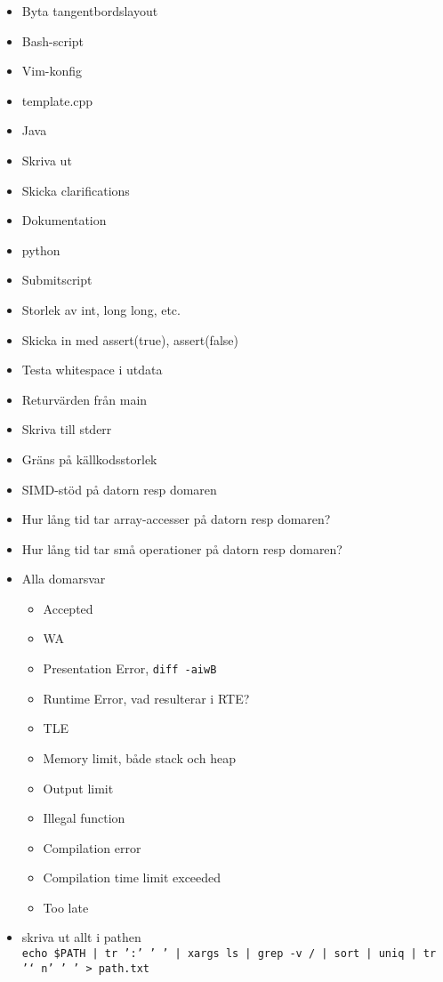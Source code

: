 \begin{itemize}
	\item Byta tangentbordslayout
	\item Bash-script
	\item Vim-konfig
	\item template.cpp
	\item Java
	\item Skriva ut
	\item Skicka clarifications
	\item Dokumentation
	\item python
	\item Submitscript
	\item Storlek av int, long long, etc.
	\item Skicka in med assert(true), assert(false)
	\item Testa whitespace i utdata
	\item Returvärden från main
	\item Skriva till stderr
	\item Gräns på källkodsstorlek
	\item SIMD-stöd på datorn resp domaren
	\item Hur lång tid tar array-accesser på datorn resp domaren?
	\item Hur lång tid tar små operationer på datorn resp domaren?
	\item Alla domarsvar
		\begin{itemize}
			\item Accepted
			\item WA
			\item Presentation Error, \texttt{diff -aiwB}
			\item Runtime Error, vad resulterar i RTE?
			\item TLE
			\item Memory limit, både stack och heap
			\item Output limit
			\item Illegal function
			\item Compilation error
			\item Compilation time limit exceeded
			\item Too late
		\end{itemize}
	\item skriva ut allt i pathen\\
		\texttt{echo \$PATH | tr ':' ' ' | xargs ls | grep -v / | sort | uniq | tr '\char`\\n' ' ' > path.txt}
\end{itemize}
